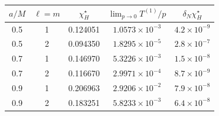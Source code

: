 \documentclass[UTF8,fontset=fandol,11pt,a4paper,oneside]{ctexart}
\numberwithin{equation}{section}
\begin{document}
\noindent\begin{minipage}{\linewidth}
\captionsetup{type=table}\caption{历史超辐射阈值响应与能流斜率，待端点修正重算。}\label{audit:tab:superradiant}
\centering\fontsize{10}{13.5}\selectfont
\setlength{\tabcolsep}{6pt}\renewcommand{\arraystretch}{1.2}
\begin{tabular}{ccccc}\toprule
$a/M$ & $\ell=m$ & $\chi_H^\star$ & $\displaystyle\lim_{p\to0}T^{(1)}/p$ & $\delta_N\chi_H^\star$\\\midrule
0.5 & 1 & 0.124051 & $1.0573\times10^{-3}$ & $4.2\times10^{-9}$\\
0.5 & 2 & 0.094350 & $1.8295\times10^{-5}$ & $2.8\times10^{-7}$\\
0.7 & 1 & 0.146970 & $5.3226\times10^{-3}$ & $1.5\times10^{-8}$\\
0.7 & 2 & 0.116670 & $2.9971\times10^{-4}$ & $8.7\times10^{-9}$\\
0.9 & 1 & 0.206963 & $2.9206\times10^{-2}$ & $7.9\times10^{-8}$\\
0.9 & 2 & 0.183251 & $5.8233\times10^{-3}$ & $6.4\times10^{-8}$\\
\bottomrule\end{tabular}
\end{minipage}\par\addvspace{10pt}
\par\addvspace{14pt}
\end{document}
